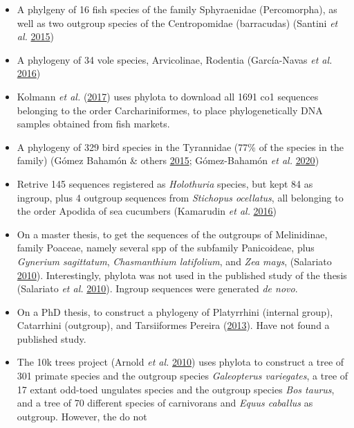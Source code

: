 \documentclass[]{article}
\begin{document}
\begin{enumerate}
\begin{itemize}
  \item
    A phylgeny of 16 fish species of the family Sphyraenidae (Percomorpha), as well
    as two outgroup species of the Centropomidae (barracudas) (Santini \emph{et al.} \protect\hyperlink{ref-santini2015first}{2015})
  \item
    A phylogeny of 34 vole species, Arvicolinae, Rodentia (García-Navas \emph{et al.} \protect\hyperlink{ref-garcia2016role}{2016})
  \item
    Kolmann \emph{et al.} (\protect\hyperlink{ref-kolmann2017dna}{2017}) uses phylota to download all 1691 co1 sequences belonging to
    the order Carchariniformes, to place phylogenetically DNA samples obtained from
    fish markets.
  \item
    A phylogeny of 329 bird species in the Tyrannidae (77\% of the species in the
    family) (Gómez Bahamón \& others \protect\hyperlink{ref-gomez2015behavioral}{2015}; Gómez-Bahamón \emph{et al.} \protect\hyperlink{ref-gomez2020speciation}{2020})
  \item
    Retrive 145 sequences registered as \emph{Holothuria} species, but kept 84 as ingroup,
    plus 4 outgroup sequences from \emph{Stichopus ocellatus}, all belonging to the order
    Apodida of sea cucumbers (Kamarudin \emph{et al.} \protect\hyperlink{ref-kamarudin2016phylogenetic}{2016})
  \item
    On a master thesis, to get the sequences of the outgroups of Melinidinae, family Poaceae, namely several spp of the
    subfamily Panicoideae, plus \emph{Gynerium sagittatum}, \emph{Chasmanthium latifolium},
    and \emph{Zea mays}, (Salariato \protect\hyperlink{ref-salariato2010filogenia}{2010}). Interestingly, phylota was not used
    in the published study of the thesis (Salariato \emph{et al.} \protect\hyperlink{ref-salariato2010molecular}{2010}). Ingroup sequences were generated \emph{de novo}.
  \item
    On a PhD thesis, to construct a phylogeny of Platyrrhini (internal group),
    Catarrhini (outgroup), and Tarsiiformes Pereira (\protect\hyperlink{ref-pereira2013padroes}{2013}). Have not found a published study.
  \item
    The 10k trees project (Arnold \emph{et al.} \protect\hyperlink{ref-arnold201010ktrees}{2010}) uses phylota to construct a tree of 301 primate species
    and the outgroup species \emph{Galeopterus variegates}, a tree of 17 extant odd-toed
    ungulates species and the outgroup species \emph{Bos taurus}, and a tree of 70 different
    species of carnivorans and \emph{Equus caballus} as outgroup. However, the do not

\end{itemize}
\end{enumerate}
\end{document}
